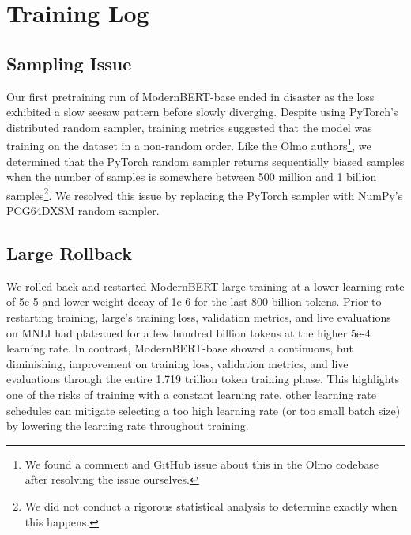 \documentclass[11pt]{article}
\begin{document}
\section{Training Log}
\label{sec:traininglog}

\subsection{Sampling Issue} 
\label{subsec:samplingissue}
Our first pretraining run of ModernBERT-base ended in disaster as the loss exhibited a slow seesaw pattern before slowly diverging. Despite using PyTorch's distributed random sampler, training metrics suggested that the model was training on the dataset in a non-random order. Like the Olmo authors\footnote{We found a comment and GitHub issue about this in the Olmo codebase after resolving the issue ourselves.}, we determined that the PyTorch random sampler returns sequentially biased samples when the number of samples is somewhere between 500 million and 1 billion samples\footnote{We did not conduct a rigorous statistical analysis to determine exactly when this happens.}. We resolved this issue by replacing the PyTorch sampler with NumPy's PCG64DXSM random sampler.

\subsection{Large Rollback}
\label{subsec:largerollback}
We rolled back and restarted ModernBERT-large training at a lower learning rate of 5e-5 and lower weight decay of 1e-6 for the last 800 billion tokens. Prior to restarting training, large’s training loss, validation metrics, and live evaluations on MNLI had plateaued for a few hundred billion tokens at the higher 5e-4 learning rate. In contrast, ModernBERT-base showed a continuous, but diminishing, improvement on training loss, validation metrics, and live evaluations through the entire 1.719 trillion token training phase. This highlights one of the risks of training with a constant learning rate, other learning rate schedules can mitigate selecting a too high learning rate (or too small batch size) by lowering the learning rate throughout training.
\end{document}
